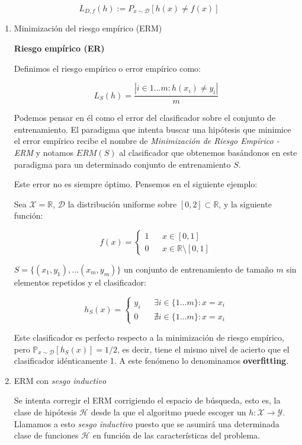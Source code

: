 \[L_{D,f}(h) :=  P_{x\sim \mathcal{D}} [h(x)\neq f(x)]\]

\begin{enumerate}
\item Minimización del riesgo empírico (ERM)
\label{sec-3-4-1-1}

\begin{definition}
\textbf{Riesgo empírico (ER)}

Definimos el riesgo empírico o error empírico como:

\[L_S(h) = \frac{|i\in {1\ldots m}: h(x_i) \neq y_i|}{m}\]
\end{definition}

Podemos pensar en él como el error del clasificador sobre el conjunto de entrenamiento. El paradigma que intenta buscar una hipótesis que minimice el error empírico recibe el nombre de \emph{Minimización de Riesgo Empírico - ERM} y notamos $ERM(S)$ al clasificador que obtenemos basándonos en este paradigma para un determinado conjunto de entrenamiento $S$.

Este error no es siempre óptimo. Pensemos en el siguiente ejemplo:

Sea $\mathcal{X} = \mathbb{R}$, $\mathcal{D}$ la distribución uniforme sobre $[0,2]\subset \mathbb{R}$, y la siguiente función:

\[f(x) = \left\{\begin{array}{lcl}
1 && x\in [0,1]\\
0 && x\in \mathbb{R}\setminus [0,1]
\end{array}\right.\]


$S = \{(x_1,y_1), \ldots (x_m, y_m)\}$ un conjunto de entrenamiento de tamaño $m$ sin elementos repetidos y el clasificador:

\[h_S(x) = \left\{\begin{array}{lcl}
y_i && \exists i\in \{1\ldots m\} : x=x_i\\
0 && \nexists i\in \{1\ldots m\} : x=x_i
\end{array}\right.\]

Este clasificador es perfecto respecto a la minimización de riesgo empírico, pero $\mathbb{P}_{x\sim \mathcal{D}}[h_S(x)] = 1/2$, es decir, tiene el mismo nivel de acierto que el clasificador idénticamente 1. A este fenómeno lo denominamos \textbf{overfitting}.

\item ERM con \emph{sesgo inductivo}
\label{sec-3-4-1-2}

Se intenta corregir el ERM corrigiendo el espacio de búsqueda, esto es, la clase de hipótesis $\mathcal{H}$ desde la que el algoritmo puede escoger un $h: \mathcal{X}\rightarrow \mathcal{Y}$. Llamamos a esto \emph{sesgo inductivo} puesto que se asumirá una determinada clase de funciones $\mathcal{H}$ en función de las características del problema.


\end{enumerate}
